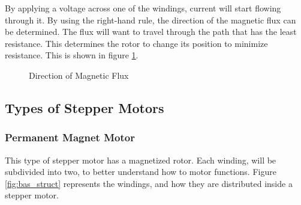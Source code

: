 By applying a voltage across one of the windings, current will start flowing through it. By using the right-hand rule, the direction of the magnetic flux can be determined. The flux will want to travel through the path that has the least resistance. This determines the rotor to change its position to minimize resistance. This is shown in figure \ref{fig:flux}.

\begin{figure}[htp]
	\centering
	\hfill
	\caption{Direction of Magnetic Flux}
	\label{fig:flux}
\end{figure}

\subsection{Types of Stepper Motors}
\subsubsection{Permanent Magnet Motor}
This type of stepper motor has a magnetized rotor. Each winding, will be subdivided into two, to better understand how to motor functions. Figure \ref{fig:bas_struct} represents the windings, and how they are distributed inside a stepper motor.

